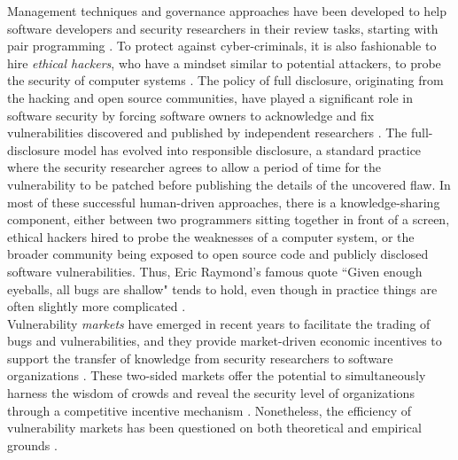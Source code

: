 Management techniques and governance approaches have been developed to help software developers and security researchers in their review tasks, starting with pair programming \cite{hulkko2005multiple}. To protect against cyber-criminals, it is also fashionable to hire {\it ethical hackers}, who have a mindset similar to potential attackers, to probe the security of computer systems \cite{smith2002ethical,saleem2006ethical,bishop2007penetration}. The policy of full disclosure, originating from the hacking and open source communities, have played a significant role in software security by forcing software owners to acknowledge and fix vulnerabilities discovered and published by independent researchers \cite{arora2008optimal}. The full-disclosure model has evolved into responsible disclosure, a standard practice where the security researcher agrees to allow a period of time for the vulnerability to be patched before publishing the details of the uncovered flaw. In most of these successful human-driven approaches, there is a knowledge-sharing component, either between two programmers sitting together in front of a screen, ethical hackers hired to probe the weaknesses of a computer system, or the broader community being exposed to open source code and publicly disclosed software vulnerabilities. Thus, Eric Raymond's famous quote ``Given enough eyeballs, all bugs are shallow" \cite{raymond1999cathedral} tends to hold, even though in practice things are often slightly more complicated \cite{hafiz2015game}.\\

Vulnerability {\it markets} have emerged in recent years to facilitate the trading of bugs and vulnerabilities, and they provide market-driven economic incentives to support the transfer of knowledge from security researchers to software organizations \cite{camp2004pricing}. These two-sided markets offer the potential to simultaneously harness the wisdom of crowds and reveal the security level of organizations through a competitive incentive mechanism \cite{schechter2002buy}. Nonetheless, the efficiency of vulnerability markets has been questioned on both theoretical \cite{kannan2005market,mckinney2007vulnerability} and empirical grounds \cite{ransbotham2008markets,algarni2014software}.\\

